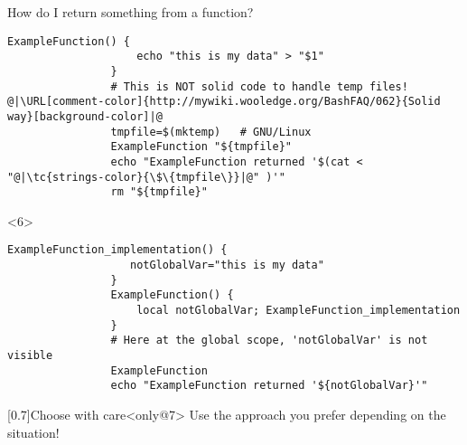 \begin{frame}[fragile]{How do I return something from a function?}
\begin{overlayarea}{\textwidth}{0.7\textheight}
\begin{onlyenv}
            \begin{lstlisting}[style=MyBash, numbers=none]
                ExampleFunction() {
                    echo "this is my data" > "$1"
                }
                # This is NOT solid code to handle temp files! @|\URL[comment-color]{http://mywiki.wooledge.org/BashFAQ/062}{Solid way}[background-color]|@
                tmpfile=$(mktemp)   # GNU/Linux
                ExampleFunction "${tmpfile}"
                echo "ExampleFunction returned '$(cat < "@|\tc{strings-color}{\$\{tmpfile\}}|@" )'"
                rm "${tmpfile}"
            \end{lstlisting}
        \end{onlyenv}
        \begin{onlyenv}<6>
            \begin{lstlisting}[style=MyBash, numbers=none, emph={[7]notGlobalVar},]
                ExampleFunction_implementation() {
                   notGlobalVar="this is my data"
                }
                ExampleFunction() {
                    local notGlobalVar; ExampleFunction_implementation
                }
                # Here at the global scope, 'notGlobalVar' is not visible
                ExampleFunction
                echo "ExampleFunction returned '${notGlobalVar}'"
            \end{lstlisting}
        \end{onlyenv}
        \vspace{-3mm}
        \begin{varblock}{}[0.7\textwidth]{Choose with care}<only@7>
            Use the approach you prefer depending on the situation!
        \end{varblock}
    \end{overlayarea}
\end{frame}








